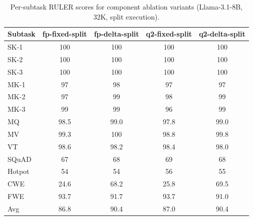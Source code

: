 \documentclass[]{mosi}
\theoremstyle{plain}
\theoremstyle{definition}
\theoremstyle{remark}
\begin{document}
\begin{table}[h]
\caption{Per-subtask RULER scores for component ablation variants (Llama-3.1-8B, 32K, split execution).}
\label{tab:component_ruler}
\begin{center}
\footnotesize
\begin{tabular}{lcccc}
\toprule
Subtask & fp-fixed-split & fp-delta-split & q2-fixed-split & q2-delta-split \\
\midrule
SK-1 & 100 & 100 & 100 & 100 \\
SK-2 & 100 & 100 & 100 & 100 \\
SK-3 & 100 & 100 & 100 & 100 \\
MK-1 & 97 & 98 & 97 & 97 \\
MK-2 & 97 & 99 & 98 & 99 \\
MK-3 & 99 & 99 & 96 & 99 \\
MQ   & 98.5 & 99.0 & 97.8 & 99.0 \\
MV   & 99.3 & 100 & 98.8 & 99.8 \\
VT   & 98.6 & 98.2 & 98.4 & 98.0 \\
SQuAD & 67 & 68 & 69 & 68 \\
Hotpot & 54 & 54 & 56 & 55 \\
CWE  & 24.6 & 68.2 & 25.8 & 69.5 \\
FWE  & 93.7 & 91.7 & 93.7 & 91.0 \\
\midrule
Avg  & 86.8 & 90.4 & 87.0 & 90.4 \\
\bottomrule
\end{tabular}
\end{center}
\end{table}
\end{document}

